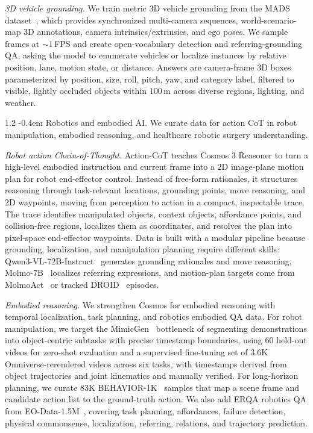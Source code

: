 \documentclass{llmxive}
\makeatletter
\providecommand{\paragraph}{  \@startsection{paragraph}{4}{\z@}    {1\baselineskip \@plus .2\baselineskip}    {-0.4em}    {\normalfont\normalsize\bfseries}}
\makeatother
\begin{document}
\textit{3D vehicle grounding.} We train metric 3D vehicle grounding from the MADS dataset~\citep{ren2025cosmos}, which provides synchronized multi-camera sequences, world-scenario-map 3D annotations, camera intrinsics/extrinsics, and ego poses. We sample frames at ${\sim}1$\,FPS and create open-vocabulary detection and referring-grounding QA, asking the model to enumerate vehicles or localize instances by relative position, lane, motion state, or distance. Answers are camera-frame 3D boxes parameterized by position, size, roll, pitch, yaw, and category label, filtered to visible, lightly occluded objects within $100$\,m across diverse regions, lighting, and weather.

\paragraph{Robotics and embodied AI.} We curate data for action CoT in robot manipulation, embodied reasoning, and healthcare robotic surgery understanding.

\textit{Robot action Chain-of-Thought.} 
Action-CoT teaches Cosmos 3 Reasoner to turn a high-level embodied instruction and current frame into a 2D image-plane motion plan for robot end-effector control. Instead of free-form rationales, it structures reasoning through task-relevant locations, grounding points, move reasoning, and 2D waypoints, moving from perception to action in a compact, inspectable trace. The trace identifies manipulated objects, context objects, affordance points, and collision-free regions, localizes them as coordinates, and resolves the plan into pixel-space end-effector waypoints. Data is built with a modular pipeline because grounding, localization, and manipulation planning require different skills: Qwen3-VL-72B-Instruct~\citep{bai2025qwen3} generates grounding rationales and move reasoning, Molmo-7B~\citep{deitke2024molmo} localizes referring expressions, and motion-plan targets come from MolmoAct~\citep{lee2025molmoact} or tracked DROID~\citep{khazatsky2024droid} episodes. 

\textit{Embodied reasoning.} 
We strengthen Cosmos for embodied reasoning with temporal localization, task planning, and robotics embodied QA data. For robot manipulation, we target the MimicGen~\citep{mandlekar2023mimicgen} bottleneck of segmenting demonstrations into object-centric subtasks with precise timestamp boundaries, using 60 held-out videos for zero-shot evaluation and a supervised fine-tuning set of 3.6K Omniverse-rerendered videos across six tasks, with timestamps derived from object trajectories and joint kinematics and manually verified. For long-horizon planning, we curate 83K BEHAVIOR-1K~\citep{li2023behavior1k} samples that map a scene frame and candidate action list to the ground-truth action. We also add ERQA robotics QA from EO-Data-1.5M~\citep{eo1}, covering task planning, affordances, failure detection, physical commonsense, localization, referring, relations, and trajectory prediction.
\end{document}
